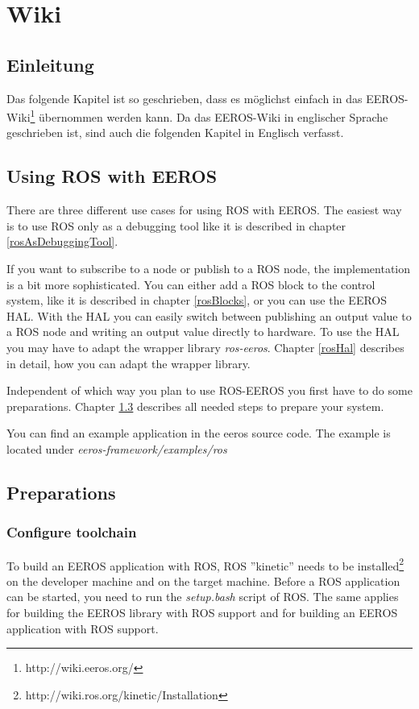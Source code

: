 \chapter{Wiki}
\section{Einleitung}
Das folgende Kapitel ist so geschrieben, dass es möglichst einfach in das EEROS-Wiki\footnote{http://wiki.eeros.org/} übernommen werden kann.
Da das EEROS-Wiki in englischer Sprache geschrieben ist, sind auch die folgenden Kapitel in Englisch verfasst.


\section{Using ROS with EEROS}	%
There are three different use cases for using ROS with EEROS.
The easiest way is to use ROS only as a debugging tool like it is described in chapter \ref{rosAsDebuggingTool}.

If you want to subscribe to a node or publish to a ROS node, the implementation is a bit more sophisticated.
You can either add a ROS block to the control system, like it is described in chapter \ref{rosBlocks}, or you can use the EEROS HAL.
With the HAL you can easily switch between publishing an output value to a ROS node and writing an output value directly to hardware.
To use the HAL you may have to adapt the wrapper library \textit{ros-eeros}.
Chapter \ref{rosHal} describes in detail, how you can adapt the wrapper library.

Independent of which way you plan to use ROS-EEROS you first have to do some preparations.
Chapter \ref{preparations} describes all needed steps to prepare your system.

You can find an example application in the eeros source code.
The example is located under \textit{eeros-framework/examples/ros}


\section{Preparations}
\label{preparations}
\subsection{Configure toolchain}
\label{configureToolchain}
To build an EEROS application with ROS, ROS ''kinetic'' needs to be installed\footnote{http://wiki.ros.org/kinetic/Installation} on the developer machine and on the target machine.
Before a ROS application can be started, you need to run the \textit{setup.bash} script of ROS.
The same applies for building the EEROS library with ROS support and for building an EEROS application with ROS support.

